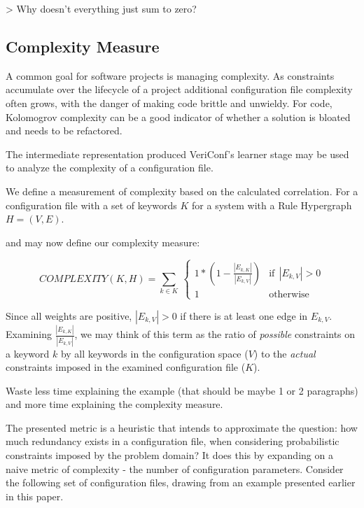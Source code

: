 > Why doesn't everything just sum to zero?

\fi
\subsection{Complexity Measure}

A common goal for software projects is managing complexity. As
constraints accumulate over the lifecycle of a project additional
configuration file complexity often grows, with the danger of
making code brittle and unwieldy. For code, Kolomogrov complexity
can be a good indicator of whether a solution is bloated and 
needs to be refactored.

The intermediate representation produced VeriConf's learner stage
may be used to analyze the complexity of a configuration file.


We define a measurement of complexity based on the calculated correlation.
For a configuration file with a set of keywords $K$ for a system
with a Rule Hypergraph $H = (V, E)$.

and may now define our complexity measure:

\begin{equation}
    COMPLEXITY(K, H) = \sum_{k \in K} \
        \begin{cases}
            1 * (1 - \frac{|E_{k, K}|}{|E_{k, V}|}) & \text{if}\ \ |E_{k, V}| > 0 \\
            1 & \text{otherwise}
        \end{cases}
\end{equation}

Since all weights are positive, $|E_{k, V}| > 0$ if there is at least one 
edge in $E_{k, V}$. Examining $\frac{|E_{k, K}|}{|E_{k, V}|}$, we may think of this
term as the ratio of {\it possible} constraints on a keyword $k$ by all keywords
in the configuration space ($V$) to the {\it actual} constraints imposed in the
examined configuration file ($K$).

Waste less time explaining the example (that should be maybe 1 or 2 paragraphs) and more time explaining the complexity measure.
\para {Semantics}

The presented metric is a heuristic that intends to approximate the question: 
how much redundancy exists in a configuration file, when considering
probabilistic constraints imposed by the problem domain? It does this by
expanding on a naive metric of complexity - the number of configuration 
parameters. Consider the following set of configuration files, drawing from
an example presented earlier in this paper.

